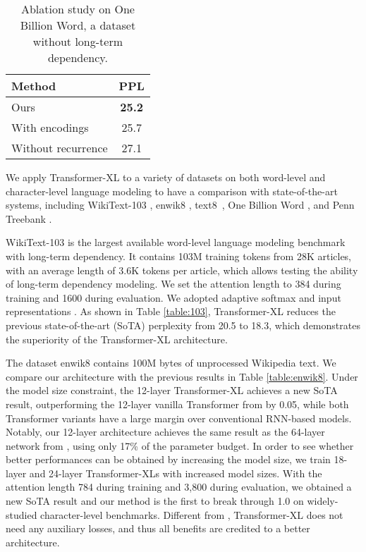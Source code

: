 \documentclass[11pt,a4paper]{article}
\begin{document}
\begin{table}[t]
    \small
    \centering
    \begin{tabular}{lc}
        \toprule
        \bf Method & \bf PPL \\
        \midrule
        Ours & \textbf{25.2} \\
        With \citet{shaw2018self} encodings & 25.7 \\
        Without recurrence & 27.1 \\
        \bottomrule
    \end{tabular}
    \caption{\small
        Ablation study on One Billion Word, a dataset without long-term dependency.
    }
    \label{table:ablation2}
\end{table}

We apply Transformer-XL to a variety of datasets on both word-level and character-level language modeling to have a comparison with state-of-the-art systems, including WikiText-103 \citep{merity2016pointer}, enwik8 \citep{mahoney2011large}, text8~\citep{mahoney2011large}, One Billion Word \citep{chelba2013one}, and Penn Treebank \citep{mikolov2012context}.

WikiText-103 is the largest available word-level language modeling benchmark with long-term dependency. It contains 103M training tokens from 28K articles, with an average length of 3.6K tokens per article, which allows testing the ability of long-term dependency modeling.
We set the attention length to 384 during training and 1600 during evaluation.
We adopted adaptive softmax and input representations \citep{baevski2018adaptive,grave2016efficient}.
As shown in Table \ref{table:103}, Transformer-XL reduces the previous state-of-the-art (SoTA) perplexity from 20.5 to 18.3, which demonstrates the superiority of the Transformer-XL architecture.


The dataset enwik8 contains 100M bytes of unprocessed Wikipedia text.
We compare our architecture with the previous results in Table \ref{table:enwik8}.
Under the model size constraint, the 12-layer Transformer-XL achieves a new SoTA result, outperforming the 12-layer vanilla Transformer from \citet{al2018character} by 0.05, while both Transformer variants have a large margin over conventional RNN-based models.
Notably, our 12-layer architecture achieves the same result as the 64-layer network from \citet{al2018character}, using only 17\% of the parameter budget.
In order to see whether better performances can be obtained by increasing the model size, we train 18-layer and 24-layer Transformer-XLs with increased model sizes.
With the attention length 784 during training and 3,800 during evaluation, we obtained a new SoTA result and our method is the first to break through 1.0 on widely-studied character-level benchmarks.
Different from \citet{al2018character}, Transformer-XL does not need any auxiliary losses, and thus all benefits are credited to a better architecture.
\end{document}

